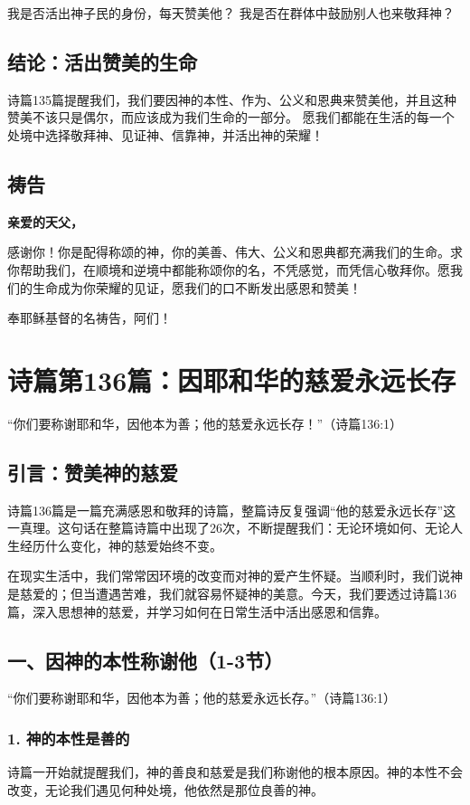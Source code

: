 \documentclass[a4paper, 12pt]{article}
\begin{document}
我是否活出神子民的身份，每天赞美他？
我是否在群体中鼓励别人也来敬拜神？
\subsection*{结论：活出赞美的生命}
诗篇135篇提醒我们，我们要因神的本性、作为、公义和恩典来赞美他，并且这种赞美不该只是偶尔，而应该成为我们生命的一部分。
愿我们都能在生活的每一个处境中选择敬拜神、见证神、信靠神，并活出神的荣耀！

\subsection*{祷告}
\textbf{亲爱的天父，}

感谢你！你是配得称颂的神，你的美善、伟大、公义和恩典都充满我们的生命。求你帮助我们，在顺境和逆境中都能称颂你的名，不凭感觉，而凭信心敬拜你。愿我们的生命成为你荣耀的见证，愿我们的口不断发出感恩和赞美！

奉耶稣基督的名祷告，阿们！
\newpage
\section{诗篇第136篇：因耶和华的慈爱永远长存}


“你们要称谢耶和华，因他本为善；他的慈爱永远长存！”（诗篇136:1）

\subsection*{引言：赞美神的慈爱}
\hspace{0.6cm}诗篇136篇是一篇充满感恩和敬拜的诗篇，整篇诗反复强调“他的慈爱永远长存”这一真理。这句话在整篇诗篇中出现了26次，不断提醒我们：无论环境如何、无论人生经历什么变化，神的慈爱始终不变。

在现实生活中，我们常常因环境的改变而对神的爱产生怀疑。当顺利时，我们说神是慈爱的；但当遭遇苦难，我们就容易怀疑神的美意。今天，我们要透过诗篇136篇，深入思想神的慈爱，并学习如何在日常生活中活出感恩和信靠。

\subsection*{一、因神的本性称谢他（1-3节）}
“你们要称谢耶和华，因他本为善；他的慈爱永远长存。”（诗篇136:1）

\subsubsection*{1. 神的本性是善的}
诗篇一开始就提醒我们，神的善良和慈爱是我们称谢他的根本原因。神的本性不会改变，无论我们遇见何种处境，他依然是那位良善的神。
\end{document}

